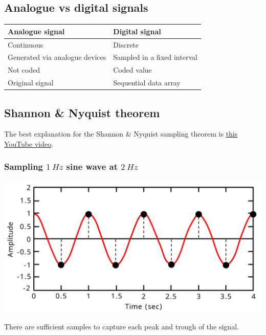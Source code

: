 \documentclass[11pt]{article}
\begin{document}
\subsection{Analogue vs digital signals}
\label{sec:org0ecee8c}
\begin{center}
\begin{tabular}{l|l}
Analogue signal & Digital signal\\
\hline
Continuous & Discrete\\
Generated via analogue devices & Sampled in a fixed interval\\
Not coded & Coded value\\
Original signal & Sequential data array\\
\end{tabular}
\end{center}
\subsection{Shannon \& Nyquist theorem}
\label{sec:org3e8aeed}
The best explanation for the Shannon \& Nyquist sampling theorem is \href{https://www.youtube.com/watch?v=Jv5FU8oUWEY}{this YouTube video}.
\subsubsection{Sampling \(\qty{1}{Hz}\) sine wave at \(\qty{2}{Hz}\)}
\label{sec:org0cd6c8c}
\begin{center}
\includegraphics[width=.9\linewidth]{./images/sampling-1hz-sine-wave-at-2hz.png}
\end{center}

There are sufficient samples to capture each peak and trough of the signal.
\end{document}
